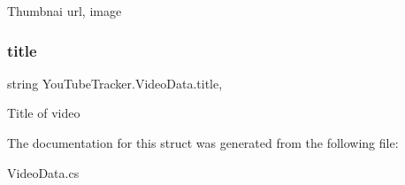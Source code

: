 Thumbnai url, image 

\mbox{\label{struct_you_tube_tracker_1_1_video_data_a27e67b8b39d459a7fb2107ab4ef7fdd7}} 
\subsubsection{\texorpdfstring{title}{title}}
{\footnotesize\ttfamily string You\+Tube\+Tracker.\+Video\+Data.\+title\hspace{0.3cm}{\ttfamily [get]}, {\ttfamily [set]}}



Title of video 



The documentation for this struct was generated from the following file\+:\begin{DoxyCompactItemize}
\item 
Video\+Data.\+cs\end{DoxyCompactItemize}
